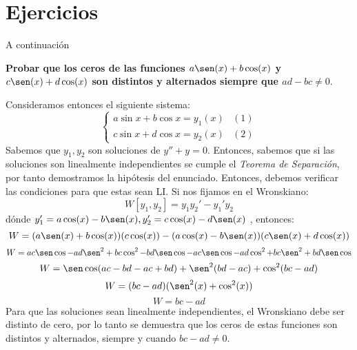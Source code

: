 \section{Ejercicios}A continuación
\begin{problem}\textbf{Probar que los ceros de las funciones $a\sen(x) + b\cos(x)$ y $c\sen(x)+d\cos(x)$ son distintos y alternados siempre que $ad-bc \neq 0$}.
\end{problem}
	Consideramos entonces el siguiente sistema: $$
	\begin{cases}
		a \sin x + b \cos x = y_1(x) & (1) \\
		c \sin x + d \cos x = y_2(x) & (2)
	\end{cases}$$
	Sabemos que $y_1 , y_2$ son soluciones de $y'' + y=0$. Entonces, sabemos que si las soluciones son linealmente independientes se cumple el \textit{Teorema de Separación}, por tanto demostramos la hipótesis del enunciado. Entonces, debemos verificar las condiciones para que estas sean LI. Si nos fijamos en el Wronskiano: $$W[y_1, y_2] =y_1y_2' - y_1'y_2 $$ dónde $y_1'  =a\cos(x) - b\sen(x), y_2' = c\cos(x) -d\sen(x)$
	, entonces: $$W = (a\sen(x) + b\cos(x))(c\cos(x)) - (a\cos(x)-b\sen(x))(c\sen(x)+d\cos(x))$$
	$$W=ac\sen\cos - ad\sen^2 + bc\cos^2 -bd\sen\cos - ac\sen\cos - ad\cos^2 + bc\sen^2 + bd\sen \cos$$
	$$W = \sen \cos (ac-bd-ac+bd) + \sen^2(bd-ac) + \cos^2(bc-ad)$$
	$$W = (bc-ad)(\sen^2(x)+ \cos^2(x))$$
	$$W = bc-ad$$
	Para que las soluciones sean linealmente independientes, el Wronskiano debe ser distinto de cero, por lo tanto se demuestra que los ceros de estas funciones son distintos y alternados, siempre y cuando $bc-ad \neq 0$.
	
	




